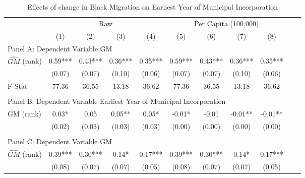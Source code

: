  \begin{table}[htbp]\centering {} \begin{threeparttable} \caption{Effects of change in Black Migration on Earliest Year of Municipal Incorporation} \begin{tabular}{l*{10}{c}} \toprule
                &\multicolumn{4}{c}{Raw}                                    &\multicolumn{4}{c}{Per Capita (100,000)}                   \\\cmidrule(lr){2-5}\cmidrule(lr){6-9}
                &\multicolumn{1}{c}{(1)}   &\multicolumn{1}{c}{(2)}   &\multicolumn{1}{c}{(3)}   &\multicolumn{1}{c}{(4)}   &\multicolumn{1}{c}{(5)}   &\multicolumn{1}{c}{(6)}   &\multicolumn{1}{c}{(7)}   &\multicolumn{1}{c}{(8)}   \\
\cmidrule(lr){1-9}
\multicolumn{8}{l}{Panel A: Dependent Variable GM}\\
\cmidrule(lr){1-9}
$\hat{GM}$ (rank)&       0.59***&       0.43***&       0.36***&       0.35***&       0.59***&       0.43***&       0.36***&       0.35***\\
                &     (0.07)   &     (0.07)   &     (0.10)   &     (0.06)   &     (0.07)   &     (0.07)   &     (0.10)   &     (0.06)   \\
\midrule
F-Stat          &      77.36   &      36.55   &      13.18   &      36.62   &      77.36   &      36.55   &      13.18   &      36.62   \\
\cmidrule[\heavyrulewidth](lr){1-9} \\ \cmidrule[\heavyrulewidth](lr){1-9}
\multicolumn{8}{l}{Panel B: Dependent Variable Earliest Year of Municipal Incorporation}\\
\cmidrule(lr){1-9}
GM  (rank)      &       0.03*  &       0.05   &       0.05** &       0.05*  &      -0.01*  &      -0.01   &      -0.01** &      -0.01** \\
                &     (0.02)   &     (0.03)   &     (0.03)   &     (0.03)   &     (0.00)   &     (0.00)   &     (0.00)   &     (0.00)   \\
\cmidrule[\heavyrulewidth](lr){1-9} \\ \cmidrule[\heavyrulewidth](lr){1-9}
\multicolumn{8}{l}{Panel C: Dependent Variable GM}\\
\cmidrule(lr){1-9}
$\hat{GM}$ (rank)&       0.39***&       0.30***&       0.14*  &       0.17***&       0.39***&       0.30***&       0.14*  &       0.17***\\
                &     (0.08)   &     (0.07)   &     (0.07)   &     (0.05)   &     (0.08)   &     (0.07)   &     (0.07)   &     (0.05)   \\

\end{tabular}
\end{threeparttable}
\end{table}
